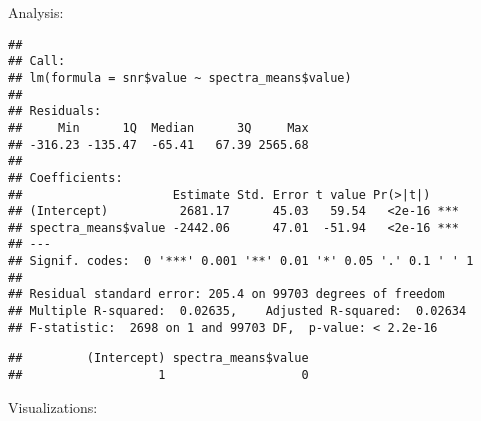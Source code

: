 \documentclass[
]{article}
\newenvironment{Shaded}{\begin{snugshade}}{\end{snugshade}}
\newcommand{\AttributeTok}[1]{\textcolor[rgb]{0.77,0.63,0.00}{#1}}
\newcommand{\ConstantTok}[1]{\textcolor[rgb]{0.00,0.00,0.00}{#1}}
\newcommand{\DecValTok}[1]{\textcolor[rgb]{0.00,0.00,0.81}{#1}}
\newcommand{\FunctionTok}[1]{\textcolor[rgb]{0.00,0.00,0.00}{#1}}
\newcommand{\NormalTok}[1]{#1}
\newcommand{\OtherTok}[1]{\textcolor[rgb]{0.56,0.35,0.01}{#1}}
\newcommand{\SpecialCharTok}[1]{\textcolor[rgb]{0.00,0.00,0.00}{#1}}
\begin{document}
Analysis:

\begin{Shaded}
\end{Shaded}

\begin{verbatim}
## 
## Call:
## lm(formula = snr$value ~ spectra_means$value)
## 
## Residuals:
##     Min      1Q  Median      3Q     Max 
## -316.23 -135.47  -65.41   67.39 2565.68 
## 
## Coefficients:
##                     Estimate Std. Error t value Pr(>|t|)    
## (Intercept)          2681.17      45.03   59.54   <2e-16 ***
## spectra_means$value -2442.06      47.01  -51.94   <2e-16 ***
## ---
## Signif. codes:  0 '***' 0.001 '**' 0.01 '*' 0.05 '.' 0.1 ' ' 1
## 
## Residual standard error: 205.4 on 99703 degrees of freedom
## Multiple R-squared:  0.02635,    Adjusted R-squared:  0.02634 
## F-statistic:  2698 on 1 and 99703 DF,  p-value: < 2.2e-16
\end{verbatim}

\begin{Shaded}
\end{Shaded}

\begin{verbatim}
##         (Intercept) spectra_means$value 
##                   1                   0
\end{verbatim}

Visualizations:
\end{document}
